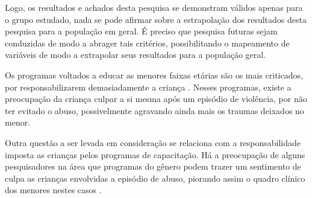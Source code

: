 




Logo, os resultados e achados desta pesquisa se demonstram válidos apenas para o grupo estudado, nada se pode afirmar sobre a estrapolação dos resultados desta pesquisa para a população em geral. É preciso que pesquisa futuras sejam conduzidas de modo a abrager tais critérios, possibilitando o mapeamento de variáveis de modo a extrapolar seus resultados para a população geral.

Os programas voltados a educar as menores faixas etárias são os mais criticados, por responsabilizarem demasiadamente a criança \cite{colleen2016advancing}. Nesses programas, existe a preocupação da criança culpar a si mesma após um episódio de violência, por não ter evitado o abuso, possivelmente agravando ainda mais os traumas deixados no menor.



\pagebreak

Outra questão a ser levada em consideração se relaciona com a responsabilidade imposta as crianças pelos programas de capacitação. Há a preocupação de alguns pesquisadores na área que programas do gênero podem trazer um sentimento de culpa as crianças envolvidas a episódio de abuso, piorando assim o quadro clínico dos menores nestes casos \cite{finkelhor2009prevention}. %

